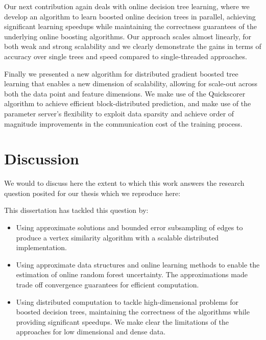 Our next contribution again deals with online decision tree learning, where we develop an algorithm
to learn boosted online decision trees in parallel, achieving significant
learning speedups while maintaining the correctness guarantees of the
underlying online boosting algorithms. Our approach scales almost linearly,
for both weak and strong scalability and we clearly demonstrate the gains
in terms of accuracy over single trees and speed compared to single-threaded
approaches.


Finally we presented a new algorithm for distributed gradient boosted tree
learning that enables a new dimension of scalability, allowing for scale-out
across both the data point and feature dimensions. We make use of the Quickscorer
algorithm to achieve efficient block-distributed prediction, and make use
of the parameter server's flexibility to exploit data sparsity and achieve
order of magnitude improvements in the communication cost of the training process.

\section{Discussion}

We would to discuss here the extent to which this work answers the research
question posited for our thesis which we reproduce here:

\begin{displayquote}
	\researchQuestion
\end{displayquote}

\noindent
This dissertation has tackled this question by:
\begin{itemize}
	\item Using approximate solutions and bounded error subsampling of edges
	to produce a vertex similarity algorithm with a scalable
	distributed implementation.

	\item Using approximate data structures and online learning methods
	to enable the estimation of online random forest uncertainty. The approximations
	made trade off convergence guarantees for efficient computation.

	\item Using distributed computation to tackle high-dimensional problems
	for boosted decision trees, maintaining the correctness of the algorithms
	while providing significant speedups. We make clear the limitations
	of the approaches for low dimensional and dense data.
\end{itemize}


